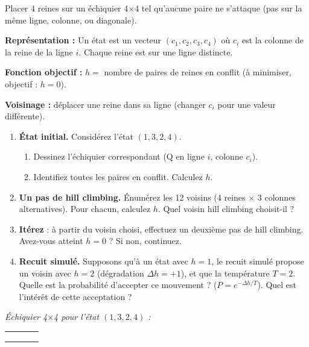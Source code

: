 \documentclass[11pt,a4paper]{article}
\begin{document}
\begin{exercicebox}[Énoncé]
Placer 4 reines sur un échiquier 4$\times$4 tel qu'aucune paire ne s'attaque (pas sur la même ligne, colonne, ou diagonale).

\textbf{Représentation :} Un état est un vecteur $(c_1, c_2, c_3, c_4)$ où $c_i$ est la colonne de la reine de la ligne $i$. Chaque reine est sur une ligne distincte.

\textbf{Fonction objectif :} $h =$ nombre de paires de reines en conflit (à minimiser, objectif : $h = 0$).

\textbf{Voisinage :} déplacer une reine dans sa ligne (changer $c_i$ pour une valeur différente).

\begin{enumerate}
    \item \textbf{État initial.} Considérez l'état $(1, 3, 2, 4)$.
    \begin{enumerate}[label=(\alph*)]
        \item Dessinez l'échiquier correspondant (Q en ligne $i$, colonne $c_i$).
        \item Identifiez toutes les paires en conflit. Calculez $h$.
    \end{enumerate}
    
    \item \textbf{Un pas de hill climbing.} Énumérez les 12 voisins (4 reines $\times$ 3 colonnes alternatives). Pour chacun, calculez $h$. Quel voisin hill climbing choisit-il ?
    
    \item \textbf{Itérez} : à partir du voisin choisi, effectuez un deuxième pas de hill climbing. Avez-vous atteint $h = 0$ ? Si non, continuez.
    
    \item \textbf{Recuit simulé.} Supposons qu'à un état avec $h = 1$, le recuit simulé propose un voisin avec $h = 2$ (dégradation $\Delta h = +1$), et que la température $T = 2$. Quelle est la probabilité d'accepter ce mouvement ? ($P = e^{-\Delta h / T}$). Quel est l'intérêt de cette acceptation ?
\end{enumerate}
\end{exercicebox}

\noindent\textit{Échiquier 4$\times$4 pour l'état $(1, 3, 2, 4)$ :}
\begin{center}
\begin{tabular}{|c|c|c|c|}
\hline
\phantom{Q} & \phantom{Q} & \phantom{Q} & \phantom{Q} \\
\hline
\phantom{Q} & \phantom{Q} & \phantom{Q} & \phantom{Q} \\
\hline
\phantom{Q} & \phantom{Q} & \phantom{Q} & \phantom{Q} \\
\hline
\phantom{Q} & \phantom{Q} & \phantom{Q} & \phantom{Q} \\
\hline
\end{tabular}
\end{center}
\end{document}
